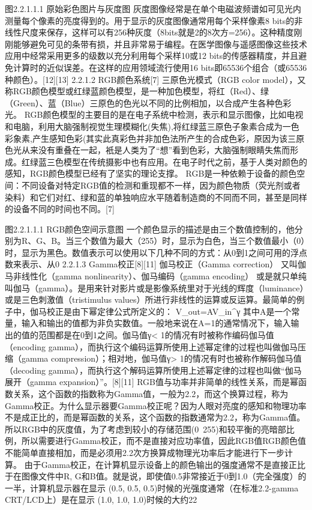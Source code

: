 图2.2.1.1.1 原始彩色图片与灰度图
灰度图像经常是在单个电磁波频谱如可见光内测量每个像素的亮度得到的。用于显示的灰度图像通常用每个采样像素8 bits的非线性尺度来保存，这样可以有256种灰度（8bits就是2的8次方=256）。这种精度刚刚能够避免可见的条带有损，并且非常易于编程。在医学图像与遥感图像这些技术应用中经常采用更多的级数以充分利用每个采样10或12 bits的传感器精度，并且避免计算时的近似误差。在这样的应用领域流行使用16 bits即65536个组合（或65536种颜色）。[12][13]
2.2.1.2 RGB颜色系统[7]
	三原色光模式（RGB color model），又称RGB颜色模型或红绿蓝颜色模型，是一种加色模型，将红（Red）、绿（Green）、蓝（Blue）三原色的色光以不同的比例相加，以合成产生各种色彩光。
RGB颜色模型的主要目的是在电子系统中检测，表示和显示图像，比如电视和电脑，利用大脑强制视觉生理模糊化(失焦),将红绿蓝三原色子象素合成为一色彩象素,产生感知色彩(其实此真彩色并非加色法所产生的合成色彩，原因为该三原色光从来没有重叠在一起，衹是人类为了“想”看到色彩，大脑强制眼睛失焦而形成。红绿蓝三色模型在传统摄影中也有应用。在电子时代之前，基于人类对颜色的感知，RGB颜色模型已经有了坚实的理论支撑。
RGB是一种依赖于设备的颜色空间：不同设备对特定RGB值的检测和重现都不一样，因为颜色物质（荧光剂或者染料）和它们对红、绿和蓝的单独响应水平随着制造商的不同而不同，甚至是同样的设备不同的时间也不同。[7]
     
图2.2.1.1.1 RGB颜色空间示意图
一个颜色显示的描述是由三个数值控制的，他分别为R、G、B。当三个数值为最大（255）时，显示为白色，当三个数值最小（0）时，显示为黑色。数值表示可以使用以下几种不同的方式：从0到1之间可用的浮点数来表示、从0%
2.2.1.3 Gamma校正[8][11]
	伽马校正（Gamma correction） 又叫伽马非线性化（gamma nonlinearity）、伽马编码（gamma encoding） 或是就只单纯叫伽马（gamma）。是用来针对影片或是影像系统里对于光线的辉度（luminance）或是三色刺激值（tristimulus values）所进行非线性的运算或反运算。最简单的例子中，伽马校正是由下幂定律公式所定义的：
V_out=AV_in^γ
	其中A是一个常量，输入和输出的值都为非负实数值。一般地来说在A=1的通常情况下，输入输出的值的范围都是在0到1之间。伽马值γ< 1的情况有时被称作编码伽马值（encoding gamma），而执行这个编码运算所使用上述幂定律的过程也叫做伽马压缩（gamma compression）；相对地，伽马值γ> 1的情况有时也被称作解码伽马值（decoding gamma），而执行这个解码运算所使用上述幂定律的过程也叫做“伽马展开（gamma expansion）”。[8][11]
	RGB值与功率并非简单的线性关系，而是幂函数关系，这个函数的指数称为Gamma值，一般为2.2，而这个换算过程，称为Gamma校正。为什么显示器要Gamma校正呢？因为人眼对亮度的感知和物理功率不是成正比的，而是幂函数的关系，这个函数的指数通常为2.2，称为Gamma值。所以RGB中的灰度值，为了考虑到较小的存储范围(0~255)和较平衡的亮暗部比例，所以需要进行Gamma校正，而不是直接对应功率值，因此RGB值RGB颜色值不能简单直接相加，而是必须用2.2次方换算成物理光功率后才能进行下一步计算。
	由于Gamma校正，在计算机显示设备上的颜色输出的强度通常不是直接正比于在图像文件中R, G和B值。就是说，即使值0.5非常接近于0到1.0（完全强度）的一半，计算机显示器在显示 (0.5, 0.5, 0.5)时候的光强度通常（在标准2.2-gamma CRT/LCD上）是在显示 (1.0, 1.0, 1.0)时候的大约22%

